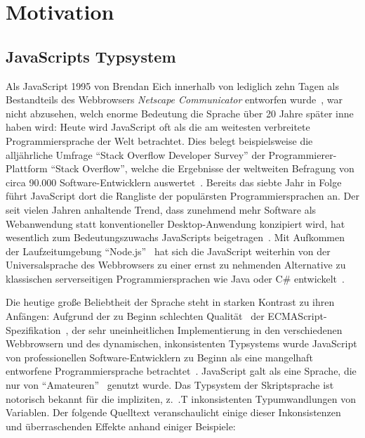 \chapter{Motivation}

\section{JavaScripts Typsystem}

Als JavaScript 1995 von Brendan Eich innerhalb von lediglich zehn Tagen als Bestandteils des Webbrowsers \textit{Netscape Communicator} entworfen wurde~\autocite{severance:2012:js10days}, war nicht abzusehen, welch enorme Bedeutung die Sprache über 20 Jahre später inne haben wird: Heute wird JavaScript oft als die am weitesten verbreitete Programmiersprache der Welt betrachtet. Dies belegt beispielsweise die alljährliche Umfrage \enquote{Stack Overflow Developer Survey} der Programmierer-Plattform \enquote{Stack Overflow}, welche die Ergebnisse der weltweiten Befragung von circa 90.000 Software-Entwicklern auswertet~\autocite{stackoverflow:survey:2019}. Bereits das siebte Jahr in Folge führt JavaScript dort die Rangliste der populärsten Programmiersprachen an.
Der seit vielen Jahren anhaltende Trend, dass zunehmend mehr Software als Webanwendung statt konventioneller Desktop-Anwendung konzipiert wird, hat wesentlich zum Bedeutungszuwachs JavaScripts beigetragen~\autocite{taivalsaari:2017}\autocite{casteleyn:2014:ria}. Mit Aufkommen der Laufzeitumgebung \enquote{Node.js}~\autocite{nodejs} hat sich die JavaScript weiterhin von der Universalsprache des Webbrowsers zu einer ernst zu nehmenden Alternative zu klassischen serverseitigen Programmiersprachen wie Java oder C\# entwickelt~\autocite{TILKOV:NODEJS}.

Die heutige große Beliebtheit der Sprache steht in starken Kontrast zu ihren Anfängen: Aufgrund der zu Beginn schlechten Qualität~\autocite{CROCKFORD:JS_MISUNDERSTOOD} der ECMAScript-Spezifikation~\autocite{ECMASCRIPT:1997}, der sehr uneinheitlichen Implementierung in den verschiedenen Webbrowsern und des dynamischen, inkonsistenten Typsystems wurde JavaScript von professionellen Software-Entwicklern zu Beginn als eine mangelhaft entworfene Programmiersprache betrachtet~\autocite{oreilly:2001:js}. JavaScript galt als eine Sprache, die nur von \enquote{Amateuren}~\autocite{CROCKFORD:JS_MISUNDERSTOOD} genutzt wurde. Das Typsystem der Skriptsprache ist notorisch bekannt für die impliziten, z.~.T inkonsistenten Typumwandlungen von Variablen. Der folgende Quelltext veranschaulicht einige dieser Inkonsistenzen und überraschenden Effekte anhand einiger Beispiele:

